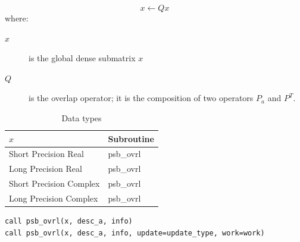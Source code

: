 \[ x \leftarrow Q x \]
where:
\begin{description}
\item[$x$] is the global dense submatrix $x$
\item[$Q$] is the overlap operator; it is the composition of two
operators $ P_a$ and $ P^{T}$. 
\end{description}

\begin{table}[h]
\begin{center}
\begin{tabular}{ll}
\hline
$x$ & {\bf Subroutine}\\
\hline
Short Precision Real & psb\_ovrl \\
Long Precision Real & psb\_ovrl \\
Short Precision Complex & psb\_ovrl \\
Long Precision Complex & psb\_ovrl \\
\hline
\end{tabular}
\end{center}
\caption{Data types\label{tab:f90ovrl}}
\end{table}

\begin{lstlisting}
call psb_ovrl(x, desc_a, info)
call psb_ovrl(x, desc_a, info, update=update_type, work=work)
\end{lstlisting} 

